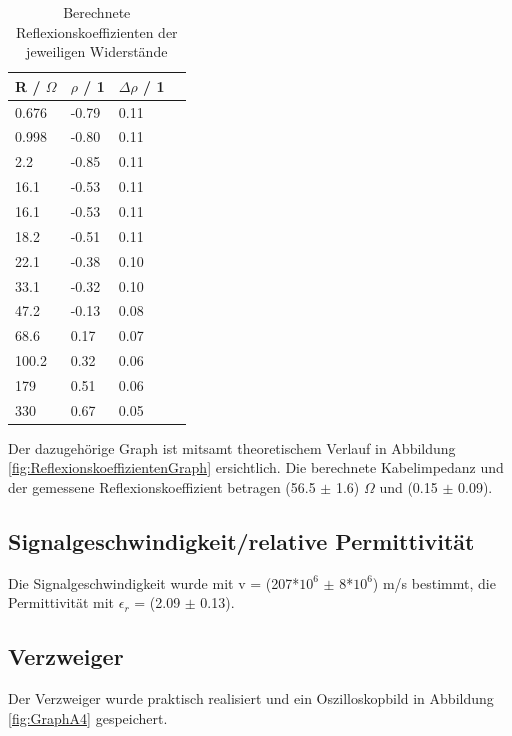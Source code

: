 \documentclass[12pt,a4paper,twoside]{article}
\begin{document}
\begin{table}[H]
    \centering
    \caption{Berechnete Reflexionskoeffizienten der jeweiligen Widerstände}
    \label{tab:ReflexionskoeffizientenZF}
    \begin{tabular}{| l | l | l | l |}
        \hline
        R / $\Omega$  & $\rho$ / 1 & $\Delta \rho$ / 1 \\
        \hline
       0.676 & -0.79 & 0.11 \\
       0.998 & -0.80 & 0.11 \\
         2.2 & -0.85 & 0.11 \\
        16.1 & -0.53 & 0.11 \\
        16.1 & -0.53 & 0.11 \\
        18.2 & -0.51 & 0.11 \\
        22.1 & -0.38 & 0.10 \\
        33.1 & -0.32 & 0.10 \\
        47.2 & -0.13 & 0.08 \\
        68.6 &  0.17 & 0.07 \\
       100.2 &  0.32 & 0.06 \\
         179 &  0.51 & 0.06 \\
         330 &  0.67 & 0.05 \\
        \hline
    \end{tabular}
\end{table}

\noindent
Der dazugehörige Graph ist mitsamt theoretischem Verlauf in Abbildung \ref{fig:ReflexionskoeffizientenGraph} ersichtlich.
Die berechnete Kabelimpedanz und der gemessene Reflexionskoeffizient betragen (56.5 $\pm$ 1.6) $\Omega$ und (0.15 $\pm$ 0.09).


\subsection{Signalgeschwindigkeit/relative Permittivität}

Die Signalgeschwindigkeit wurde mit v = (207*$10^6$ $\pm$ 8*$10^6$) m/s bestimmt, die Permittivität mit $\epsilon_r$ = (2.09 $\pm$ 0.13).


\subsection{Verzweiger}

Der Verzweiger wurde praktisch realisiert und ein Oszilloskopbild in Abbildung \ref{fig:GraphA4} gespeichert.

\printbibliography[heading=bibintoc]
\end{document}

